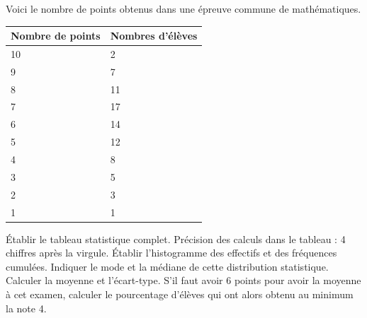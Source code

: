 \begin{exercice}
Voici le nombre de points obtenus dans une épreuve commune de mathématiques.

\begin{tabular}{|l|l|}
\hline
Nombre de points & Nombres d'élèves \\ \hline
10               & 2                \\ \hline
9                & 7                \\ \hline
8                & 11               \\ \hline
7                & 17               \\ \hline
6                & 14               \\ \hline
5                & 12               \\ \hline
4                & 8                \\ \hline
3                & 5                \\ \hline
2                & 3                \\ \hline
1                & 1                \\ \hline
\end{tabular}

Établir le tableau statistique complet. Précision des calculs dans le tableau : 4 chiffres après la virgule.
Établir l'histogramme des effectifs et des fréquences cumulées.
Indiquer le mode et la médiane de cette distribution statistique.
Calculer la moyenne et l'écart-type.
S'il faut avoir 6 points pour avoir la moyenne à cet examen, calculer le pourcentage d'élèves qui ont alors obtenu au minimum la note 4.
\end{exercice}

